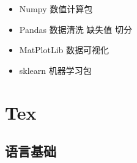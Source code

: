 \documentclass[]{book}
\providecommand{\tightlist}{%
  \setlength{\itemsep}{0pt}\setlength{\parskip}{0pt}}
\begin{document}
\begin{itemize}
\tightlist
\item
  Numpy 数值计算包
\item
  Pandas 数据清洗 缺失值 切分
\item
  MatPlotLib 数据可视化
\item
  sklearn 机器学习包
\end{itemize}

\hypertarget{tex}{%
\section{Tex}\label{tex}}

\subsection{语言基础}
\end{document}
